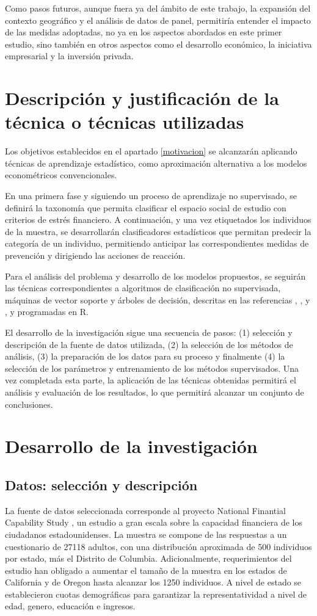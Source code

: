 \documentclass[a4paper, 11pt]{article}
\begin{document}
Como pasos futuros, aunque fuera ya del ámbito de este trabajo, la expansión del contexto geográfico
y el análisis de datos de panel, permitiría entender el impacto de las medidas adoptadas, no ya en los
aspectos abordados en este primer estudio, sino también en otros aspectos como el desarrollo económico,
la iniciativa empresarial y la inversión privada. 

\section{Descripción y justificación de la técnica o técnicas utilizadas}
Los objetivos establecidos en el apartado \ref{motivacion} se alcanzarán aplicando técnicas de aprendizaje
estadístico, como aproximación alternativa a los modelos econométricos convencionales. 

En una primera fase y siguiendo un proceso de aprendizaje no supervisado, se definirá la taxonomía que permita
clasificar el espacio social de estudio con criterios de estrés financiero. A continuación, y una vez etiquetados
los individuos de la muestra, se desarrollarán clasificadores estadísticos que permitan predecir la categoría de un 
individuo, permitiendo anticipar las correspondientes medidas de prevención y dirigiendo las acciones de reacción. 

Para el análisis del problema y desarrollo de los modelos propuestos, se seguirán las técnicas correspondientes
a algoritmos de clasificación no supervisada, máquinas de vector soporte y árboles de decisión, descritas en las
referencias \cite{lantz23}, \cite{Hastie23}, \cite{aurelien17} y \cite{Hastie13}, y programadas en R\cite{R24}.

El desarrollo de la investigación sigue una secuencia de pasos: (1) selección y descripción de la fuente de datos utilizada,
(2) la selección de los métodos de análisis, (3) la preparación de los datos para su proceso y finalmente (4) la selección
de los parámetros y entrenamiento de los métodos supervisados. Una vez completada esta parte, la aplicación de
las técnicas obtenidas permitirá el análisis y evaluación de los resultados, lo que permitirá alcanzar un conjunto
de conclusiones.

\section{Desarrollo de la investigación}
\subsection{Datos: selección y descripción}
La fuente de datos seleccionada corresponde al proyecto National Finantial Capability Study \cite{NFCS01}, 
un estudio a gran escala sobre la capacidad financiera de los ciudadanos estadounidenses. La muestra se 
compone de las respuestas a un cuestionario de 27118 adultos, con una distribución aproximada de 500
individuos por estado, más el Distrito de Columbia. Adicionalmente, requerimientos del estudio han obligado
a aumentar el tamaño de la muestra en los estados de California y de Oregon hasta alcanzar los 1250 individuos.
A nivel de estado se establecieron cuotas demográficas para garantizar la representatividad a nivel de edad,
genero, educación e ingresos.
\end{document}
